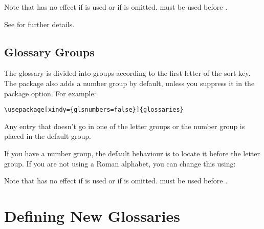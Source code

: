 \documentclass[report,inlinetitle]{nlctdoc}
\begin{document}
\begin{important}
Note that  has no effect if 
is used or if  is omitted.
 must be used before 
.
\end{important}

See  for further details.

\section{Glossary Groups}
\label{sec:groups}

The glossary is divided into groups according to the first
letter of the sort key. The  package also adds
a number group by default, unless you suppress it in the
 package option. For example:
\begin{verbatim}
\usepackage[xindy={glsnumbers=false}]{glossaries}
\end{verbatim}
Any entry that doesn't go in one of the letter groups or the
number group is placed in the default group.

If you have a number group, the default behaviour is to locate
it before the  letter group. If you are not using a
Roman alphabet, you can change this using:

\DescribeMacro{\GlsSetXdyFirstLetterAfterDigits}
\begin{definition}
\end{definition}

\begin{important}
Note that  has no effect if 
 is used or if  is omitted.
 must be used before 
.\par
\end{important}

\chapter{Defining New Glossaries}
\label{sec:newglossary}
\end{document}
